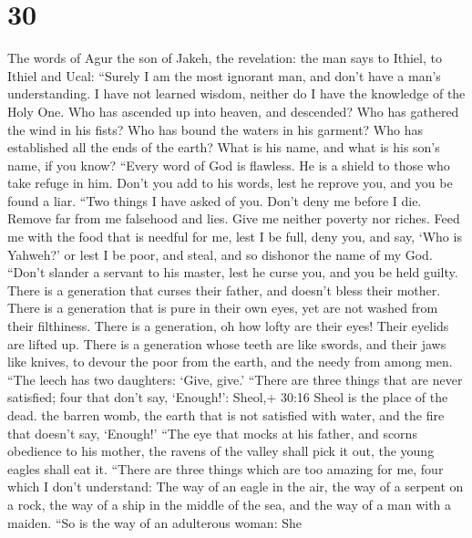 \hypertarget{section-24}{%
\section{30}\label{section-24}}

 The words of Agur the son of Jakeh, the revelation: the man
says to Ithiel, to Ithiel and Ucal:  ``Surely I am the most
ignorant man, and don't have a man's understanding.  I have
not learned wisdom, neither do I have the knowledge of the Holy One.
 Who has ascended up into heaven, and descended? Who has
gathered the wind in his fists? Who has bound the waters in his garment?
Who has established all the ends of the earth? What is his name, and
what is his son's name, if you know?  ``Every word of God is
flawless. He is a shield to those who take refuge in him. 
Don't you add to his words, lest he reprove you, and you be found a
liar.  ``Two things I have asked of you. Don't deny me
before I die.  Remove far from me falsehood and lies. Give
me neither poverty nor riches. Feed me with the food that is needful for
me,  lest I be full, deny you, and say, `Who is Yahweh?' or
lest I be poor, and steal, and so dishonor the name of my God.
 ``Don't slander a servant to his master, lest he curse
you, and you be held guilty.  There is a generation that
curses their father, and doesn't bless their mother.  There
is a generation that is pure in their own eyes, yet are not washed from
their filthiness.  There is a generation, oh how lofty are
their eyes! Their eyelids are lifted up.  There is a
generation whose teeth are like swords, and their jaws like knives, to
devour the poor from the earth, and the needy from among men.
 ``The leech has two daughters: `Give, give.' ``There are
three things that are never satisfied; four that don't say, `Enough!':
 Sheol,+ 30:16 Sheol is the place of the dead. the barren
womb, the earth that is not satisfied with water, and the fire that
doesn't say, `Enough!'  ``The eye that mocks at his father,
and scorns obedience to his mother, the ravens of the valley shall pick
it out, the young eagles shall eat it.  ``There are three
things which are too amazing for me, four which I don't understand:
 The way of an eagle in the air, the way of a serpent on a
rock, the way of a ship in the middle of the sea, and the way of a man
with a maiden.  ``So is the way of an adulterous woman: She
